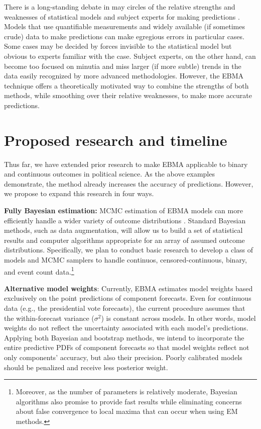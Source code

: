 \documentclass[pdftex,12pt,fullpage,oneside]{amsart}
\begin{document}
There is a long-standing debate in may circles of the relative
strengths and weaknesses of statistical models and subject experts for
making predictions \citep[e.g.,][]{Ascher:1979}.  Models that use
quantifiable measurements and widely available (if sometimes crude)
data to make predictions can make egregious errors in particular
cases.  Some cases may be decided by forces invisible to the
statistical model but obvious to experts familiar with the case.
Subject experts, on the other hand, can become too focused on minutia
and miss larger (if more subtle) trends in the data easily recognized
by more advanced methodologies.  However, the EBMA technique offers a
theoretically motivated way to combine the strengths of both methods,
while smoothing over their relative weaknesses, to make more accurate
predictions.

\section{Proposed research and timeline}

Thus far, we have extended prior research to make EBMA applicable to
binary and continuous outcomes in political science.  As the above
examples demonstrate, the method already increases the accuracy of
predictions.  However, we propose to expand this research in four
ways.

\textbf{Fully Bayesian estimation:} MCMC estimation of EBMA models can
more efficiently handle a wider variety of outcome distributions
\citep{Vrugt:2008}.  Standard Bayesian methods, such as data
augmentation, will allow us to build a set of statistical results and
computer algorithms appropriate for an array of assumed outcome
distributions.  Specifically, we plan to conduct basic research to
develop a class of models and MCMC samplers to handle continuos,
censored-continuous, binary, and event count data.\footnote{Moreover,
  as the number of parameters is relatively moderate, Bayesian
  algorithms also promise to provide fast results while eliminating
  concerns about false convergence to local maxima that can occur when
  using EM methods.}

\textbf{Alternative model weights}:  Currently, EBMA estimates model weights based exclusively on the point
predictions of component forecasts.  Even for continuous data (e.g.,
the presidential vote forecasts), the current procedure assumes that
the within-forecast variance ($\sigma^2$) is constant across models.
In other words, model weights do not reflect the uncertainty
associated with each model's predictions.  Applying both Bayesian and
bootstrap methods, we intend to incorporate the entire predictive PDFs
of component forecasts so that model weights reflect not only
components' accuracy, but also their precision.  Poorly calibrated
models should be penalized and receive less posterior weight.
\end{document}
